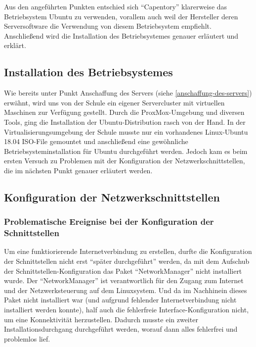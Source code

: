 Aus den angeführten Punkten entschied sich ``Capentory'' klarerweise das
Betriebsystem Ubuntu zu verwenden, vorallem auch weil der Hersteller
deren Serversoftware die Verwendung von diesem Betriebsystem empfiehlt.
Anschließend wird die Installation des Betriebsystemes genauer erläutert
und erklärt.

\hypertarget{installation-des-betriebsystemes}{%
\subsection{Installation des
Betriebsystemes}\label{installation-des-betriebsystemes}}

Wie bereits unter Punkt Anschaffung des Servers (siehe
\ref{anschaffung-des-servers}) erwähnt, wird uns von der Schule ein
eigener Servercluster mit virtuellen Maschinen zur Verfügung gestellt.
Durch die ProxMox-Umgebung und diversen Tools, ging die Installation der
Ubuntu-Distribution rasch von der Hand. In der Virtualisierungsumgebung
der Schule musste nur ein vorhandenes Linux-Ubuntu 18.04 ISO-File
gemountet und anschließend eine gewöhnliche Betriebsysteminstallation
für Ubuntu durchgeführt werden. Jedoch kam es beim ersten Versuch zu
Problemen mit der Konfiguration der Netzwerkschnittstellen, die im
nächsten Punkt genauer erläutert werden.

\hypertarget{konfiguration-der-netzwerkschnittstellen}{%
\subsection{Konfiguration der
Netzwerkschnittstellen}\label{konfiguration-der-netzwerkschnittstellen}}

\hypertarget{problematische-ereignise-bei-der-konfiguration-der-schnittstellen}{%
\subsubsection{Problematische Ereignise bei der Konfiguration der
Schnittstellen}\label{problematische-ereignise-bei-der-konfiguration-der-schnittstellen}}

Um eine funktiorierende Internetverbindung zu erstellen, durfte die
Konfiguration der Schnittstellen nicht erst ``später durchgeführt''
werden, da mit dem Aufschub der Schnittstellen-Konfiguration das Paket
``NetworkManager'' nicht installiert wurde. Der ``NetworkManager'' ist
verantwortlich für den Zugang zum Internet und der Netzwerksteuerung auf
dem Linuxsystem. Und da im Nachhinein dieses Paket nicht installiert war
(und aufgrund fehlender Internetverbindung nicht installiert werden
konnte), half auch die fehlerfreie Interface-Konfiguration nicht, um
eine Konnektivität herzustellen. Dadurch musste ein zweiter
Installationsdurchgang durchgeführt werden, worauf dann alles fehlerfrei
und problemlos lief.

